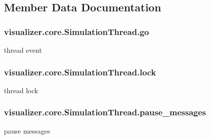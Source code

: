 \subsection{Member Data Documentation}
\subsubsection[{\texorpdfstring{go}{go}}]{\setlength{\rightskip}{0pt plus 5cm}visualizer.\+core.\+Simulation\+Thread.\+go}\hypertarget{classvisualizer_1_1core_1_1SimulationThread_a7e64c094f90302c5d7a42da3b5da6e88}{}\label{classvisualizer_1_1core_1_1SimulationThread_a7e64c094f90302c5d7a42da3b5da6e88}


thread event 

\subsubsection[{\texorpdfstring{lock}{lock}}]{\setlength{\rightskip}{0pt plus 5cm}visualizer.\+core.\+Simulation\+Thread.\+lock}\hypertarget{classvisualizer_1_1core_1_1SimulationThread_a3262a20d074f55cd3ae531e6bb690fdb}{}\label{classvisualizer_1_1core_1_1SimulationThread_a3262a20d074f55cd3ae531e6bb690fdb}


thread lock 

\subsubsection[{\texorpdfstring{pause\+\_\+messages}{pause_messages}}]{\setlength{\rightskip}{0pt plus 5cm}visualizer.\+core.\+Simulation\+Thread.\+pause\+\_\+messages}\hypertarget{classvisualizer_1_1core_1_1SimulationThread_a0645b6d9f8cadce5ab77e3cd4bc5d99b}{}\label{classvisualizer_1_1core_1_1SimulationThread_a0645b6d9f8cadce5ab77e3cd4bc5d99b}


pause messages 

